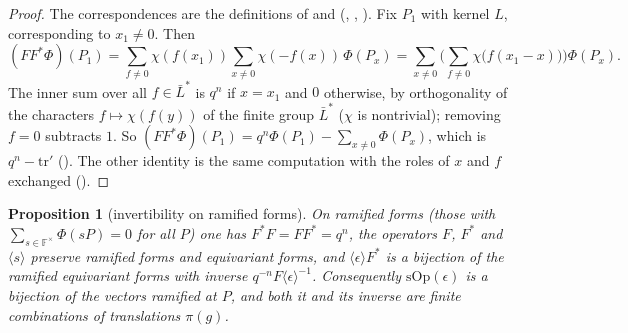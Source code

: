 \documentclass[11pt]{article}
\newcommand{\Fq}{\mathbb F}
\newtheorem{proposition}[theorem]{Proposition}
\theoremstyle{definition}
\theoremstyle{remark}
\begin{document}
\begin{proof}
The correspondences are the definitions of  and  (, , ). Fix $P_1$ with kernel $L$, corresponding to $x_1\ne0$. Then
\[
(FF^{*}\Phi)(P_1)=\sum_{f\ne0}\chi(f(x_1))\sum_{x\ne0}\chi(-f(x))\,\Phi(P_x)=\sum_{x\ne0}\Big(\sum_{f\ne0}\chi\big(f(x_1-x)\big)\Big)\Phi(P_x).
\]
The inner sum over all $f\in\bar L^{*}$ is $q^{n}$ if $x=x_1$ and $0$ otherwise, by orthogonality of the characters $f\mapsto\chi(f(y))$ of the finite group $\bar L^{*}$ ($\chi$ is nontrivial); removing $f=0$ subtracts $1$. So $(FF^{*}\Phi)(P_1)=q^{n}\Phi(P_1)-\sum_{x\ne0}\Phi(P_x)$, which is $q^{n}-\mathrm{tr}'$ (). The other identity is the same computation with the roles of $x$ and $f$ exchanged ().
\end{proof}

\begin{proposition}[invertibility on ramified forms]\label{prop:F}
On ramified forms (those with $\sum_{s\in\Fq^\times}\Phi(sP)=0$ for all $P$) one has $F^{*}F=FF^{*}=q^{n}$, the operators $F$, $F^{*}$ and $\langle s\rangle$ preserve ramified forms and equivariant forms, and $\langle\epsilon\rangle F^{*}$ is a bijection of the ramified equivariant forms with inverse $q^{-n}F\langle\epsilon\rangle^{-1}$. Consequently $\mathrm{sOp}(\epsilon)$ is a bijection of the vectors ramified at $P$, and both it and its inverse are finite combinations of translations $\pi(g)$.
\end{proposition}
\end{document}
